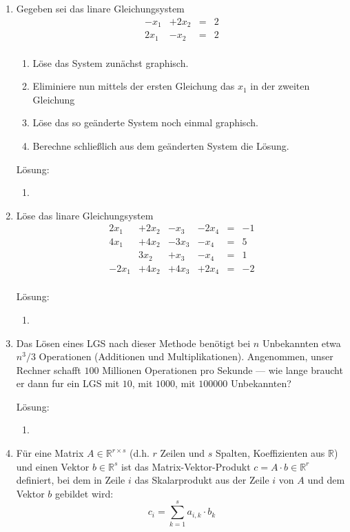 \documentclass[../main.tex]{subfiles}
\begin{document}
\begin{enumerate}
	\item Gegeben sei das linare Gleichungsystem
	      \[ \begin{array}{cccc}
			      -x_1 & +2 x_2 & = & 2 \\
			      2x_1 & -x_2   & = & 2 \\
		      \end{array} \]
	      \begin{enumerate}
		      \item Löse das System zunächst graphisch.
		      \item Eliminiere nun mittels der ersten Gleichung das \( x_1 \)
		            in der zweiten Gleichung
		      \item Löse das so geänderte System noch einmal graphisch.
		      \item Berechne schließlich aus dem geänderten System die Lösung.
		\end{enumerate} 
		
		Lösung:
		\begin{enumerate}
			\item 
		\end{enumerate}
	\item Löse das linare Gleichungsystem
	      \[ \begin{array}{cccccc}
			      2x_1  & +2x_2 & -x_3  & -2x_4 & = & -1 \\
			      4x_1  & +4x_2 & -3x_3 & -x_4  & = & 5  \\
			            & 3x_2  & +x_3  & -x_4  & = & 1  \\
			      -2x_1 & +4x_2 & +4x_3 & +2x_4 & = & -2 \\
		      \end{array} \]
		
		Lösung:
		\begin{enumerate}
			\item 
		\end{enumerate}
	\item Das Lösen eines LGS nach dieser Methode benötigt bei \( n \) Unbekannten etwa
	      \( n^3/3 \) Operationen (Additionen und Multiplikationen). Angenommen, unser
	      Rechner schafft \( 100 \) Millionen Operationen pro Sekunde — wie lange braucht
	      er dann fur ein LGS mit \( 10 \), mit \( 1000 \), mit \( 100000 \) Unbekannten?
		
		Lösung:
		\begin{enumerate}
			\item 
		\end{enumerate}
	\item Für eine Matrix \( A \in \mathbb{R}^{ r \times s } \) (d.h. \( r \) Zeilen und \( s \)
	      Spalten, Koeffizienten aus
	      \( \mathbb{R} \)) und einen Vektor \( b \in \mathbb{R}^s \) ist das Matrix-Vektor-Produkt
	      \( c = A \cdot b \in \mathbb{R}^r \) definiert, bei dem in Zeile \( i \) das Skalarprodukt
	      aus der Zeile \( i \) von \( A \) und dem Vektor \( b \) gebildet wird:
	      \[ c_i = \sum_{ k = 1 }^{s} a_{i,k} \cdot b_k \]


\end{enumerate}
\end{document}
